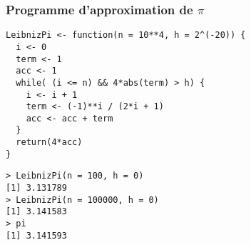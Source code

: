 \documentclass[10pt]{beamer}
\begin{document}
\begin{frame}[fragile]
  \frametitle{Programme d'approximation de $\pi$}
  \begin{lstlisting}[style=editor]
LeibnizPi <- function(n = 10**4, h = 2^(-20)) {
  i <- 0
  term <- 1
  acc <- 1
  while( (i <= n) && 4*abs(term) > h) {
    i <- i + 1
    term <- (-1)**i / (2*i + 1)
    acc <- acc + term
  }
  return(4*acc)
}
\end{lstlisting}

\begin{lstlisting}
> LeibnizPi(n = 100, h = 0)
[1] 3.131789
> LeibnizPi(n = 100000, h = 0)
[1] 3.141583
> pi
[1] 3.141593  
\end{lstlisting}

\end{frame}
\end{document}
